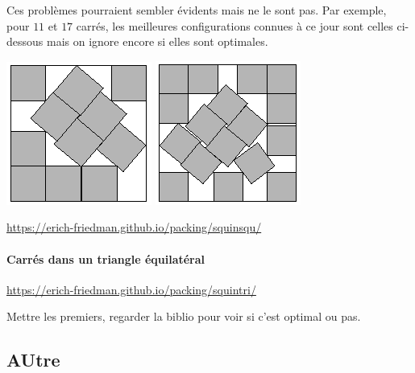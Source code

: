 \begin{exo}
\begin{center}
\end{center}
Ces problèmes pourraient sembler évidents mais ne le sont pas. Par exemple, pour $11$ et $17$ carrés, les meilleures configurations connues à ce jour sont celles ci-dessous mais on ignore encore si elles sont optimales.
\begin{center}
\includegraphics[scale=.5]{sqinsq/s11.png}
\includegraphics[scale=.5]{sqinsq/s17.png}
\end{center}
\begin{hint}
\end{hint}
\begin{sol}
\url{https://erich-friedman.github.io/packing/squinsqu/}
\end{sol}
\end{exo}


\paragraph{Carrés dans un triangle équilatéral }

\url{https://erich-friedman.github.io/packing/squintri/}

Mettre les premiers, regarder la biblio pour voir si c'est optimal ou pas.

\subsection{AUtre}






